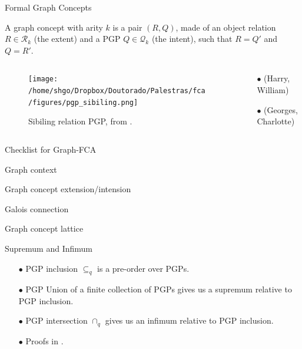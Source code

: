 \documentclass[pdf,xcolor=table]{beamer}
\newcommand{\cmark}{\ding{51}}%
\newcommand{\done}{\rlap{$\square$}{\raisebox{2pt}{\large\hspace{1pt}\cmark}}%
\hspace{-2.5pt}}
\begin{document}
\begin{frame}[t]{Formal Graph Concepts}
    \begin{definition}
        A graph concept with arity $k$ is a pair $(R, Q)$, made of an object relation $R \in \mathcal{R}_k$ (the extent) and a PGP $Q \in \mathcal{Q}_k$ (the intent), such that $R = Q'$ and $Q = R'$.
    \end{definition}
    \begin{columns}
        \begin{column}{0.5\textwidth}
            \begin{figure}[h]
                \texttt{[image: /home/shgo/Dropbox/Doutorado/Palestras/fca/figures/pgp\_sibiling.png]}
                \caption{Sibiling relation PGP, from \cite{Ferre2016}.}
            \end{figure}
        \end{column}
        \begin{column}{0.5\textwidth}
            \begin{itemize}
                \item[$\bullet$] (Harry, William)
                \item[$\bullet$] (Georges, Charlotte)
            \end{itemize}
        \end{column}
    \end{columns}
\end{frame}

\begin{frame}[t]{Checklist for Graph-FCA}
    \begin{todolist}
        \item[\done] Graph context
        \item[\done] Graph concept extension/intension
        \item[\done] Galois connection
        \item Graph concept lattice
    \end{todolist}
\end{frame}

\begin{frame}[t]{Supremum and Infimum}
    \begin{itemize}{}
        \item[$\bullet$] PGP inclusion $\subseteq_q$ is a pre-order over PGPs.
        \item[$\bullet$] PGP Union of a finite collection of PGPs gives us a supremum relative to PGP inclusion.
        \item[$\bullet$] PGP intersection $\cap_q$ gives us an infimum relative to PGP inclusion.
        \item[$\bullet$] Proofs in \cite{Ferre2015}.
    \end{itemize}
\end{frame}
\end{document}
